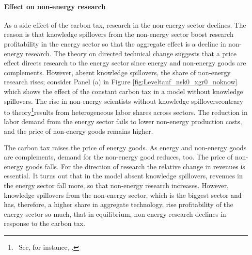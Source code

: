 \paragraph{Effect on non-energy research}
As a side effect of the carbon tax, research in the non-energy sector declines. 
The reason is that knowledge spillovers from the non-energy sector boost research profitability in the energy sector so that the aggregate effect is a decline in non-energy research. The theory on directed technical change suggests that a price effect directs research to the energy sector since energy and non-energy goods are complements.  However, absent knowledge spillovers, the share of non-energy research rises; consider Panel (a) in Figure \ref{fig:Leveltauf_nsk0_xgr0_noknow} which shows the effect of the constant carbon tax in a model without knowledge spillovers. The rise in non-energy scientists without knowledge spillovers\textemdash contrary to  theory\footnote{\ See, for instance,  \cite{Hemous2021DirectedEconomics}.}\textemdash results from heterogeneous labor shares across sectors. The reduction in labor demand from the energy sector fails to lower non-energy production costs, and the price of non-energy goods remains higher. 

 The carbon tax raises the price of energy goods. As energy and non-energy goods are complements, demand for the non-energy good reduces, too. The price of non-energy goods falls. For the direction of research the relative change in revenues is essential. 
	It turns out that in the model absent knowledge spillovers, revenues in the energy sector fall more, so that non-energy research increases. However, knowledge spillovers from the non-energy sector, which is the biggest sector and has, therefore, a higher share in aggregate technology, rise profitability of the energy sector so much, that in equilibrium, non-energy research declines in response to the carbon tax. 
	
